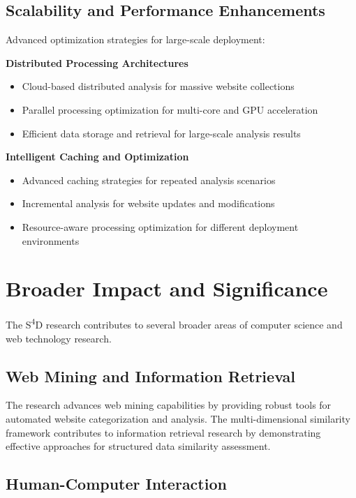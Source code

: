 \subsection{Scalability and Performance Enhancements}
\label{subsec:scalability-enhancements}

Advanced optimization strategies for large-scale deployment:

\textbf{Distributed Processing Architectures}
\begin{itemize}
    \item Cloud-based distributed analysis for massive website collections
    \item Parallel processing optimization for multi-core and GPU acceleration
    \item Efficient data storage and retrieval for large-scale analysis results
\end{itemize}

\textbf{Intelligent Caching and Optimization}
\begin{itemize}
    \item Advanced caching strategies for repeated analysis scenarios
    \item Incremental analysis for website updates and modifications
    \item Resource-aware processing optimization for different deployment environments
\end{itemize}

\section{Broader Impact and Significance}
\label{sec:broader-impact}

The S\textsuperscript{4}D research contributes to several broader areas of computer science and web technology research.

\subsection{Web Mining and Information Retrieval}
\label{subsec:web-mining-impact}

The research advances web mining capabilities by providing robust tools for automated website categorization and analysis. The multi-dimensional similarity framework contributes to information retrieval research by demonstrating effective approaches for structured data similarity assessment.

\subsection{Human-Computer Interaction}
\label{subsec:hci-impact}

